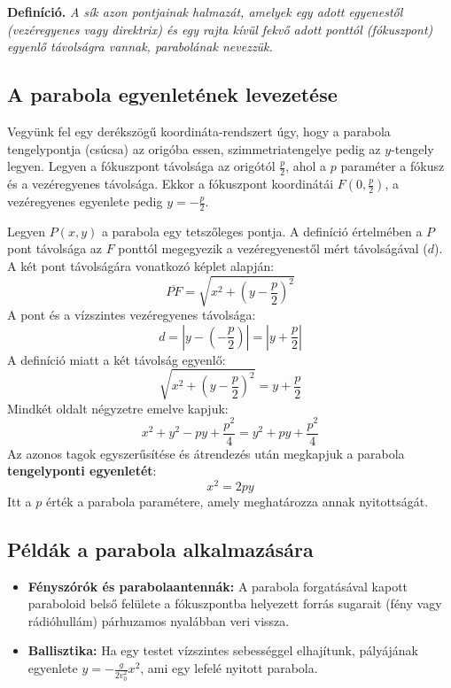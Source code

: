 \documentclass[12pt, a4paper]{article}
\newcommand{\textbfr}[1]{\textbf{\textcolor{bvred}{#1}}}
\begin{document}
\textbf{Definíció.} \textit{A sík azon pontjainak halmazát, amelyek egy adott egyenestől (vezéregyenes vagy direktrix) és egy rajta kívül fekvő adott ponttól (fókuszpont) egyenlő távolságra vannak, \textcolor{bvred}{parabolának} nevezzük.}

\subsection*{A parabola egyenletének levezetése}

Vegyünk fel egy derékszögű koordináta-rendszert úgy, hogy a parabola tengelypontja (csúcsa) az origóba essen, szimmetriatengelye pedig az $y$-tengely legyen. Legyen a fókuszpont távolsága az origótól $\frac{p}{2}$, ahol a $p$ paraméter a fókusz és a vezéregyenes távolsága. Ekkor a fókuszpont koordinátái $F\left(0, \frac{p}{2}\right)$, a vezéregyenes egyenlete pedig $y = -\frac{p}{2}$.

Legyen $P(x,y)$ a parabola egy tetszőleges pontja. A definíció értelmében a $P$ pont távolsága az $F$ ponttól megegyezik a vezéregyenestől mért távolságával ($d$). A két pont távolságára vonatkozó képlet alapján:
\[ \overline{PF} = \sqrt{x^2 + \left(y - \frac{p}{2}\right)^2} \]
A pont és a vízszintes vezéregyenes távolsága:
\[ d = \left| y - \left(-\frac{p}{2}\right) \right| = \left| y + \frac{p}{2} \right| \]
A definíció miatt a két távolság egyenlő:
\[ \sqrt{x^2 + \left(y - \frac{p}{2}\right)^2} = y + \frac{p}{2} \]
Mindkét oldalt négyzetre emelve kapjuk:
\[ x^2 + y^2 - py + \frac{p^2}{4} = y^2 + py + \frac{p^2}{4} \]
Az azonos tagok egyszerűsítése és átrendezés után megkapjuk a parabola \textbfr{tengelyponti egyenletét}:
\[ x^2 = 2py \]
Itt a $p$ érték a parabola paramétere, amely meghatározza annak nyitottságát.

\subsection*{Példák a parabola alkalmazására}
\begin{itemize}
    \item \textbf{Fényszórók és parabolaantennák:} A parabola forgatásával kapott paraboloid belső felülete a fókuszpontba helyezett forrás sugarait (fény vagy rádióhullám) párhuzamos nyalábban veri vissza.
    \item \textbf{Ballisztika:} Ha egy testet vízszintes sebességgel elhajítunk, pályájának egyenlete $y = -\frac{g}{2v_0^2}x^2$, ami egy lefelé nyitott parabola.
\end{itemize}
\end{document}
